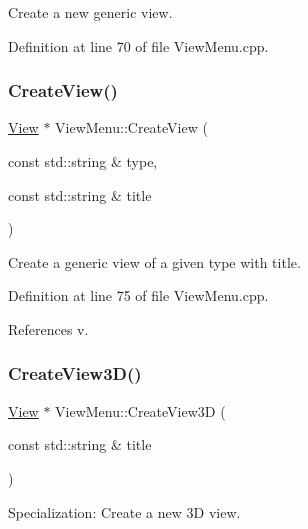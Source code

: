 Create a new generic view. 

Definition at line 70 of file View\+Menu.\+cpp.

\hypertarget{class_d_d4hep_1_1_view_menu_a892a83a22a71cfaaed9dca2c8f5a3f67}{}\label{class_d_d4hep_1_1_view_menu_a892a83a22a71cfaaed9dca2c8f5a3f67} 
\subsubsection{\texorpdfstring{Create\+View()}{CreateView()}\hspace{0.1cm}{\footnotesize\ttfamily [2/2]}}
{\footnotesize\ttfamily \hyperlink{class_d_d4hep_1_1_view}{View} $\ast$ View\+Menu\+::\+Create\+View (\begin{DoxyParamCaption}\item[{const std\+::string \&}]{type,  }\item[{const std\+::string \&}]{title }\end{DoxyParamCaption})}



Create a generic view of a given type with title. 



Definition at line 75 of file View\+Menu.\+cpp.



References v.

\hypertarget{class_d_d4hep_1_1_view_menu_a6fe4cbbcdf7aa56913ae390730d8d12f}{}\label{class_d_d4hep_1_1_view_menu_a6fe4cbbcdf7aa56913ae390730d8d12f} 
\subsubsection{\texorpdfstring{Create\+View3\+D()}{CreateView3D()}}
{\footnotesize\ttfamily \hyperlink{class_d_d4hep_1_1_view}{View} $\ast$ View\+Menu\+::\+Create\+View3D (\begin{DoxyParamCaption}\item[{const std\+::string \&}]{title }\end{DoxyParamCaption})}



Specialization\+: Create a new 3D view. 

